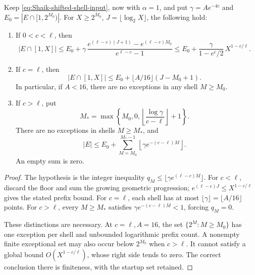 \begin{proposition}
\label{prop:Shaik-linear-shell}
Keep \eqref{eq:Shaik-shifted-shell-input}, now with \(\alpha=1\),
and put \(\gamma=Ae^{-4c}\) and
\(E_0=|E\cap[1,2^{M_0})|\).
For \(X\ge2^{M_0}\), \(J=\lfloor\log_2X\rfloor\), the following hold:
\begin{enumerate}
\item If \(0<c<\ell\), then
\[
 |E\cap[1,X]|\le E_0+
 \gamma\,\frac{e^{(\ell-c)(J+1)}-e^{(\ell-c)M_0}}
                   {e^{\ell-c}-1}
 \le E_0+\frac{\gamma}{1-e^{c}/2}\,X^{1-c/\ell}.
\]
\item If \(c=\ell\), then
\[
 |E\cap[1,X]|\le E_0+\lfloor A/16\rfloor(J-M_0+1).
\]
In particular, if \(A<16\), there are no exceptions in any shell
\(M\ge M_0\).
\item If \(c>\ell\), put
\[
 M_*=\max\left\{M_0,0,
       \left\lfloor\frac{\log\gamma}{c-\ell}\right\rfloor+1\right\}.
\]
There are no exceptions in shells \(M\ge M_*\), and
\[
 |E|\le E_0+\sum_{M=M_0}^{M_*-1}
                     \left\lfloor\gamma e^{-(c-\ell)M}\right\rfloor.
\]
An empty sum is zero.
\end{enumerate}
\end{proposition}
\begin{proof}
The hypothesis is the integer inequality
\(q_M\le\lfloor\gamma e^{(\ell-c)M}\rfloor\).
For \(c<\ell\), discard the floor and sum the growing geometric
progression; \(e^{(\ell-c)J}\le X^{1-c/\ell}\) gives the stated
prefix bound. For \(c=\ell\), each shell has at most
\(\lfloor\gamma\rfloor=\lfloor A/16\rfloor\) points.
For \(c>\ell\), every \(M\ge M_*\) satisfies
\(\gamma e^{-(c-\ell)M}<1\), forcing \(q_M=0\).

These distinctions are necessary. At \(c=\ell,A=16\), the set
\(\{2^M:M\ge M_0\}\) has one exception per shell and unbounded
logarithmic prefix count. A nonempty finite exceptional set may
also occur below \(2^{M_0}\) when \(c>\ell\).
It cannot satisfy a global bound \(O(X^{1-c/\ell})\), whose right
side tends to zero. The correct conclusion there is finiteness,
with the startup set retained.
\end{proof}

